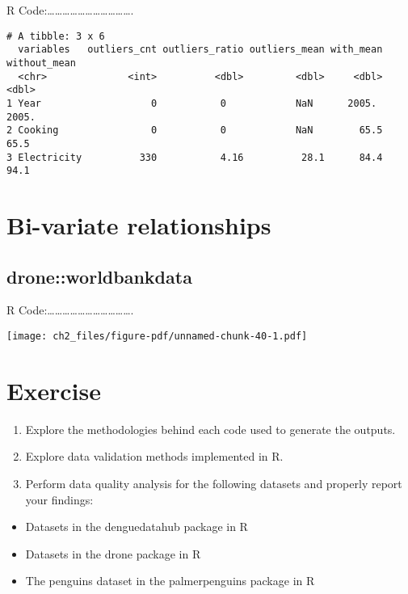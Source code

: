 \documentclass[
  letterpaper,
  DIV=11,
  numbers=noendperiod]{scrreprt}
\begin{document}
R
Code:\ldots\ldots\ldots\ldots\ldots\ldots\ldots\ldots\ldots\ldots\ldots.

\begin{verbatim}
# A tibble: 3 x 6
  variables   outliers_cnt outliers_ratio outliers_mean with_mean without_mean
  <chr>              <int>          <dbl>         <dbl>     <dbl>        <dbl>
1 Year                   0           0            NaN      2005.        2005. 
2 Cooking                0           0            NaN        65.5         65.5
3 Electricity          330           4.16          28.1      84.4         94.1
\end{verbatim}

\section{Bi-variate relationships}\label{bi-variate-relationships}

\subsection{drone::worldbankdata}\label{droneworldbankdata-1}

R
Code:\ldots\ldots\ldots\ldots\ldots\ldots\ldots\ldots\ldots\ldots\ldots.

\texttt{[image: ch2\_files/figure-pdf/unnamed-chunk-40-1.pdf]}

\section{Exercise}\label{exercise-1}

\begin{enumerate}
\def\labelenumi{\arabic{enumi}.}
\item
  Explore the methodologies behind each code used to generate the
  outputs.
\item
  Explore data validation methods implemented in R.
\item
  Perform data quality analysis for the following datasets and properly
  report your findings:
\end{enumerate}

\begin{itemize}
\item
  Datasets in the denguedatahub package in R
\item
  Datasets in the drone package in R
\item
  The penguins dataset in the palmerpenguins package in R
\end{itemize}
\end{document}

